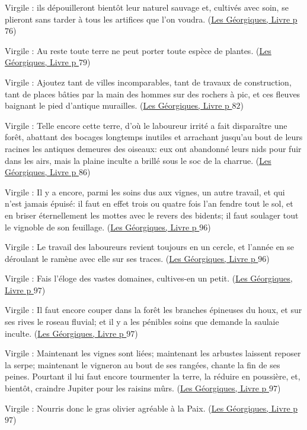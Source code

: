 \documentclass[a4paper, 11pt, hidelinks]{article}
\newcommand{\bs}{\bigskip}
\newcommand{\rb}[1]{\Romanbar{#1}}
\newcommand{\citer}[3]{\bs \begin{center} \textcolor{authorGray}{#1 :} \textcolor{citationRed}{\og #2 \fg} \textcolor{authorGray}{(\underline{#3})} \end{center} \bs}
\begin{document}
\citer{Virgile}{ils dépouilleront bientôt leur naturel sauvage et, cultivés avec soin, se plieront sans tarder à tous les 
artifices que l'on voudra.}{Les Géorgiques, Livre \rb{2} p $76$}


\citer{Virgile}{Au reste toute terre ne peut porter toute espèce de plantes.}{Les Géorgiques, Livre \rb{2} p $79$}


\citer{Virgile}{Ajoutez tant de villes incomparables, tant de travaux de construction, tant de places bâties par la main des 
hommes sur des rochers à pic, et ces fleuves baignant le pied d'antique murailles.}{Les Géorgiques, Livre \rb{2} p $82$}


\citer{Virgile}{Telle encore cette terre, d'où le laboureur irrité a fait disparaître une forêt, abattant des bocages longtemps
inutiles et arrachant jusqu'au bout de leurs racines les antiques demeures des oiseaux: eux ont abandonné leurs nids pour fuir
dans les airs, mais la plaine inculte a brillé sous le soc de la charrue.}{Les Géorgiques, Livre \rb{2} p $86$}


\citer{Virgile}{Il y a encore, parmi les soins dus aux vignes, un autre travail, et qui n'est jamais épuisé: il faut en effet
trois ou quatre fois l'an fendre tout le sol, et en briser éternellement les mottes avec le revers des bidents; il faut soulager
tout le vignoble de son feuillage.}{Les Géorgiques, Livre \rb{2} p $96$}


\citer{Virgile}{Le travail des laboureurs revient toujours en un cercle, et l'année en se déroulant le ramène avec elle sur ses 
traces.}{Les Géorgiques, Livre \rb{2} p $96$}


\citer{Virgile}{Fais l'éloge des vastes domaines, cultives-en un petit.}{Les Géorgiques, Livre \rb{2} p $97$}


\citer{Virgile}{Il faut encore couper dans la forêt les branches épineuses du houx, et sur ses rives le roseau fluvial; et il y a les
pénibles soins que demande la saulaie inculte.}{Les Géorgiques, Livre \rb{2} p $97$}


\citer{Virgile}{Maintenant les vignes sont liées; maintenant les arbustes laissent reposer la serpe; maintenant le vigneron au bout de 
ses rangées, chante la fin de ses peines. Pourtant il lui faut encore tourmenter la terre, la réduire en poussière, et, bientôt,
craindre Jupiter pour les raisins mûrs.}{Les Géorgiques, Livre \rb{2} p $97$}


\citer{Virgile}{Nourris donc le gras olivier agréable à la Paix.}{Les Géorgiques, Livre \rb{2} p $97$}
\end{document}
